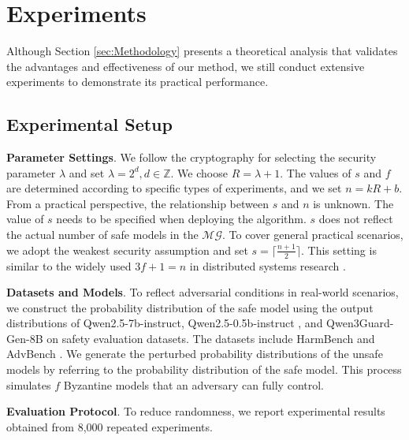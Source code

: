 \documentclass[11pt]{article}
\begin{document}



\section{Experiments}
\label{sec:experiment}
Although Section \ref{sec:Methodology} presents a theoretical analysis that validates the advantages and effectiveness of our method, we still conduct extensive experiments to demonstrate its practical performance.



\subsection{Experimental Setup}
\noindent
\textbf{Parameter Settings}.
We follow the cryptography \citep{Ruan2025haw, Couteau2022sharp} for selecting the security parameter $\lambda$ and set
$\lambda = 2^d, d \in \mathbb{Z}.$ We choose $R = \lambda + 1$. The values of $s$ and $f$ are determined according to specific types of experiments, and we set $n = kR + b$. From a practical perspective, the relationship between $s$ and $n$ is unknown. The value of $s$ needs to be specified when deploying the algorithm. $s$ does not reflect the actual number of safe models in the $\mathcal{MG}$. To cover general practical scenarios, we adopt the weakest security assumption and set $s = \lceil \frac{n+1}{2} \rceil$. This setting is similar to the widely used $3f+1=n$ in distributed systems research \citep{zhang2023waterbear, Zhang2022pace}.



\noindent
\textbf{Datasets and Models}. 
To reflect adversarial conditions in real-world scenarios, we construct the probability distribution of the safe model using the output distributions of Qwen2.5-7b-instruct, Qwen2.5-0.5b-instruct \citep{qwen2025qwen25technicalreport}, and Qwen3Guard-Gen-8B \citep{zhao2025qwen3guard} on safety evaluation datasets. The datasets include HarmBench \citep{mazeika2024harmbench} and AdvBench \citep{zou2023universal}. We generate the perturbed probability distributions of the unsafe models by referring to the probability distribution of the safe model. This process simulates $f$ Byzantine models that an adversary can fully control. 

\noindent
\textbf{Evaluation Protocol}. To reduce randomness, we report experimental results obtained from 8,000 repeated experiments.
\end{document}
